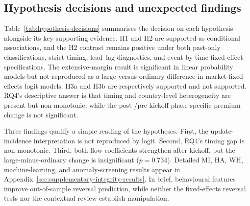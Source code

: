 \subsection{Hypothesis decisions and unexpected findings}
\label{sec:hypothesis-decisions}

Table~\ref{tab:hypothesis-decisions} summarises the decision on each hypothesis alongside its key supporting evidence. H1 and H2 are supported as conditional associations, and the H2 contrast remains positive under both past-only classifications, strict timing, lead--lag diagnostics, and event-by-time fixed-effect specifications. The extensive-margin result is significant in linear probability models but not reproduced as a large-versus-ordinary difference in market-fixed-effects logit models. H3a and H3b are respectively supported and not supported. RQ4's descriptive answer is that timing and country-level heterogeneity are present but non-monotonic, while the post-/pre-kickoff phase-specific premium change is not significant.



Three findings qualify a simple reading of the hypotheses. First, the
update-incidence interpretation is not reproduced by logit. Second, RQ4's timing
gap is non-monotonic. Third, both flow coefficients strengthen after kickoff,
but the large-minus-ordinary change is insignificant ($p=0.734$). Detailed MI,
HA, WH, machine-learning, and anomaly-screening results appear in
Appendix~\ref{sec:supplementary-integrity-results}. In brief, behavioural
features improve out-of-sample reversal prediction, while neither the
fixed-effects reversal tests nor the contextual review establish manipulation.
